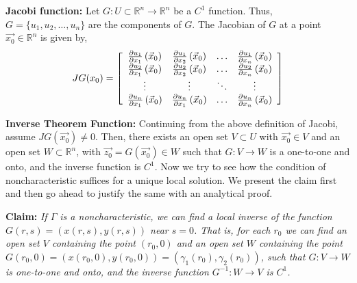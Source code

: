 \documentclass[11pt, a4paper]{report}
\begin{document}
{\bfseries Jacobi function:} Let $G:U\subset\mathbb{R}^{n} \rightarrow \mathbb{R}^{n}$ be a $C^1$ function. Thus, 
$G = \{u_1, u_2,\ldots,u_n\}$ are the components of $G$. The Jacobian of $G$ at a point $\vec{x_0}\in\mathbb{R}^{n}$ is
given by,
\begin{equation*}
    JG(x_0) = \left[\begin{array}{ c c c c }{{\frac{\partial u_1}{\partial x_1}}\left(\vec{x}_{0}\right) } & {{\frac{\partial u_1}{\partial x_2}}\left(\vec{x}_{0}\right)} & {\dots} & {{\frac{\partial u_1}{\partial x_n}}\left(\vec{x}_{0}\right)} \\ 
    {{\frac{\partial u_2}{\partial x_1}}\left(\vec{x}_{0}\right)} & {{\frac{\partial u_2}{\partial x_2}}\left(\vec{x}_{0}\right)} & {\dots} & {{\frac{\partial u_2}{\partial x_n}}\left(\vec{x}_{0}\right)} \\ 
    {\vdots} & {\vdots} & {\ddots} & {\vdots} \\ 
    {{\frac{\partial u_n}{\partial x_1}}\left(\vec{x}_{0}\right)} & {{\frac{\partial u_n}{\partial x_1}}\left(\vec{x}_{0}\right)} & {\dots} & {{\frac{\partial u_n}{\partial x_n}}\left(\vec{x}_{0}\right)} \end{array}\right]    
\end{equation*}

{\bfseries Inverse Theorem Function:} Continuing from the above definition of Jacobi, assume $JG(\vec{x_0})\neq0$. Then,
there exists an open set $V\subset U$ with $\vec{x_0}\in V$ and an open set $W\subset \mathbb{R}^{n}$, with 
$\vec{z_0} = G(\vec{x_0})\in W$ such that $G:V\rightarrow W$ is a one-to-one and onto, and the inverse function  
is $C^1$.
Now we try to see how  the condition of noncharacteristic suffices for a unique local solution. We present the claim
first and then go ahead to justify the same with an analytical proof.

{\bfseries Claim:} {\emph{If $\Gamma$ is a noncharacteristic, we can find a local inverse of the function $G(r,s) = (x(r, s), y(r, s))$
near $s=0$. That is, for each $r_0$ we can find an open set $V$ containing the point $(r_0, 0)$ and an open set $W$ 
containing the point $G(r_0, 0) = (x(r_0, 0), y(r_0, 0)) = (\gamma_1(r_0), \gamma_2(r_0))$, such that $G:V\rightarrow W$
is one-to-one and onto, and the inverse function $G^{-1}:W\rightarrow V$ is $C^1$.}}
\end{document}
